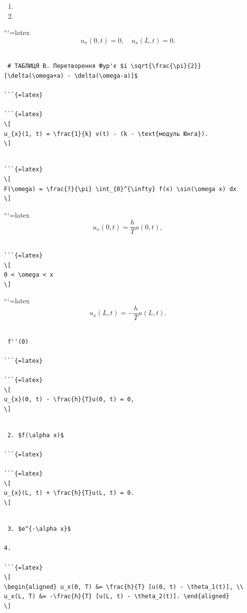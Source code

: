 \documentclass[
  ukrainian,
]{article}
\providecommand{\tightlist}{%
  \setlength{\itemsep}{0pt}\setlength{\parskip}{0pt}}
\begin{document}
\begin{enumerate}
\def\labelenumi{\arabic{enumi}.}
\setcounter{enumi}{18}
\tightlist
\item
\item
\end{enumerate}

```{=latex}
\[
u_x(0, t) = 0, \quad u_x(L, t) = 0.
\]

\begin{verbatim}

 # ТАБЛИЦЯ B. Перетворення Фур'є $i \sqrt{\frac{\pi}{2}} [\delta(\omega+a) - \delta(\omega-a)]$ 

```{=latex}

```{=latex}
\[
u_{x}(1, t) = \frac{1}{k} v(t) - (k - \text{модуль Юнга}).
\]
\end{verbatim}

\begin{verbatim}

```{=latex}
\[
F(\omega) = \frac{?}{\pi} \int_{0}^{\infty} f(x) \sin(\omega x) dx
\]
\end{verbatim}

```{=latex}
\[
u_{x}(0, t) = \frac{h}{T} u(0, t),
\]

\begin{verbatim}

```{=latex}
\[
0 < \omega < x
\]
\end{verbatim}

```{=latex}
\[
u_{x}(L, t) = -\frac{h}{T} u(L, t).
\]

\begin{verbatim}

 f''(0)

```{=latex}

```{=latex}
\[
u_{x}(0, t) - \frac{h}{T}u(0, t) = 0,
\]
\end{verbatim}

\begin{verbatim}

 2. $f(\alpha x)$ 

```{=latex}

```{=latex}
\[
u_{x}(L, t) + \frac{h}{T}u(L, t) = 0.
\]
\end{verbatim}

\begin{verbatim}

 3. $e^{-\alpha x}$ 

4.

```{=latex}
\[
\begin{aligned} u_x(0, T) &= \frac{h}{T} [u(0, t) - \theta_1(t)], \\ u_x(L, T) &= -\frac{h}{T} [u(L, t) - \theta_2(t)]. \end{aligned}
\]
\end{verbatim}
\end{document}
